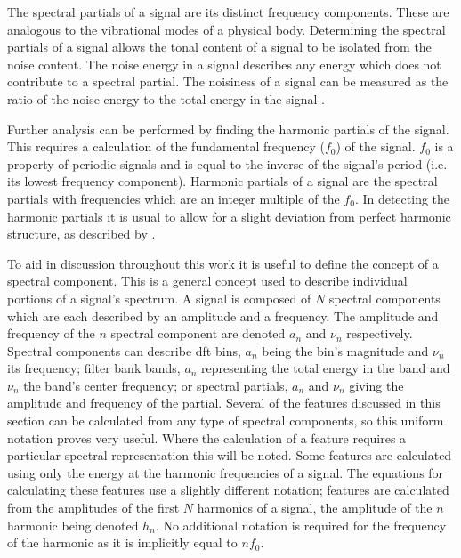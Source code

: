 		The spectral partials of a signal are its distinct frequency components. These are analogous to the
		vibrational modes of a physical body. Determining the spectral partials of a signal allows the tonal
		content of a signal to be isolated from the noise content. The noise energy in a signal describes any
		energy which does not contribute to a spectral partial. The noisiness of a signal can be measured as the
		ratio of the noise energy to the total energy in the signal \citep{serra1998sound}.

		Further analysis can be performed by finding the harmonic partials of the signal. This requires a
		calculation of the fundamental frequency ($f_{0}$) of the signal. $f_{0}$ is a property of periodic signals
		and is equal to the inverse of the signal's period (i.e. its lowest frequency component). Harmonic partials
		of a signal are the spectral partials with frequencies which are an integer multiple of the $f_{0}$. In
		detecting the harmonic partials it is usual to allow for a slight deviation from perfect harmonic
		structure, as described by \citet{peeters2011the}.

		To aid in discussion throughout this work it is useful to define the concept of a spectral component. This
		is a general concept used to describe individual portions of a signal's spectrum. A signal is composed of
		$N$ spectral components which are each described by an amplitude and a frequency. The amplitude and
		frequency of the $n$ spectral component are denoted $a_{n}$ and $\nu_{n}$ respectively. Spectral
		components can describe \acrshort{dft} bins, $a_{n}$ being the bin's magnitude and $\nu_{n}$ its frequency;
		filter bank bands, $a_{n}$ representing the total energy in the band and $\nu_{n}$ the band's center
		frequency; or spectral partials, $a_{n}$ and $\nu_{n}$ giving the amplitude and frequency of the partial.
		Several of the features discussed in this section can be calculated from any type of spectral components,
		so this uniform notation proves very useful. Where the calculation of a feature requires a particular
		spectral representation this will be noted. Some features are calculated using only the energy at the
		harmonic frequencies of a signal. The equations for calculating these features use a slightly different
		notation; features are calculated from the amplitudes of the first $N$ harmonics of a signal, the amplitude
		of the $n$ harmonic being denoted $h_{n}$. No additional notation is required for the frequency
		of the harmonic as it is implicitly equal to $nf_{0}$.

